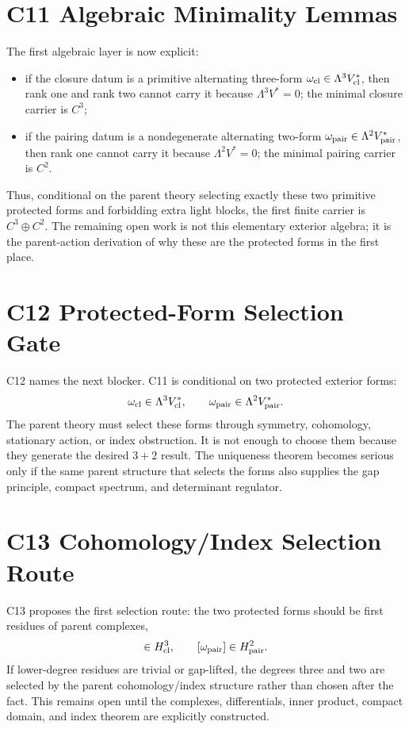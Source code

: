 \documentclass[11pt]{article}
\begin{document}
\section{C11 Algebraic Minimality Lemmas}
The first algebraic layer is now explicit:
\begin{itemize}
\item if the closure datum is a primitive alternating three-form
$\omega_{\rm cl}\in\Lambda^3V_{\rm cl}^*$, then rank one and rank two cannot
carry it because $\Lambda^3V^*=0$; the minimal closure carrier is $C^3$;
\item if the pairing datum is a nondegenerate alternating two-form
$\omega_{\rm pair}\in\Lambda^2V_{\rm pair}^*$, then rank one cannot carry it
because $\Lambda^2V^*=0$; the minimal pairing carrier is $C^2$.
\end{itemize}
Thus, conditional on the parent theory selecting exactly these two primitive
protected forms and forbidding extra light blocks, the first finite carrier is
$C^3\oplus C^2$.  The remaining open work is not this elementary exterior
algebra; it is the parent-action derivation of why these are the protected
forms in the first place.

\section{C12 Protected-Form Selection Gate}
C12 names the next blocker.  C11 is conditional on two protected exterior forms:
\begin{equation}
\omega_{\rm cl}\in\Lambda^3V_{\rm cl}^*,
\qquad
\omega_{\rm pair}\in\Lambda^2V_{\rm pair}^* .
\end{equation}
The parent theory must select these forms through symmetry, cohomology,
stationary action, or index obstruction.  It is not enough to choose them
because they generate the desired $3+2$ result.  The uniqueness theorem becomes
serious only if the same parent structure that selects the forms also supplies
the gap principle, compact spectrum, and determinant regulator.

\section{C13 Cohomology/Index Selection Route}
C13 proposes the first selection route: the two protected forms should be first
residues of parent complexes,
\begin{equation}
[\omega_{\rm cl}]\in H^3_{\rm cl},\qquad
[\omega_{\rm pair}]\in H^2_{\rm pair}.
\end{equation}
If lower-degree residues are trivial or gap-lifted, the degrees three and two
are selected by the parent cohomology/index structure rather than chosen after
the fact.  This remains open until the complexes, differentials, inner product,
compact domain, and index theorem are explicitly constructed.
\end{document}
